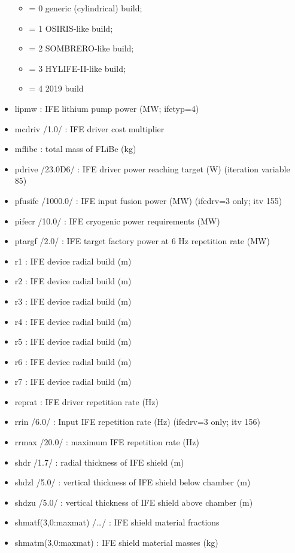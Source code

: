 \documentclass[]{article}
\providecommand{\tightlist}{%
  \setlength{\itemsep}{0pt}\setlength{\parskip}{0pt}}
\begin{document}
\begin{itemize}
  \begin{itemize}
  \tightlist
  \item
    = 0 generic (cylindrical) build;
  \item
    = 1 OSIRIS-like build;
  \item
    = 2 SOMBRERO-like build;
  \item
    = 3 HYLIFE-II-like build;
  \item
    = 4 2019 build
  \end{itemize}
\item
  lipmw : IFE lithium pump power (MW; ifetyp=4)
\item
  mcdriv /1.0/ : IFE driver cost multiplier
\item
  mflibe : total mass of FLiBe (kg)
\item
  pdrive /23.0D6/ : IFE driver power reaching target (W) (iteration
  variable 85)
\item
  pfusife /1000.0/ : IFE input fusion power (MW) (ifedrv=3 only; itv
  155)
\item
  pifecr /10.0/ : IFE cryogenic power requirements (MW)
\item
  ptargf /2.0/ : IFE target factory power at 6 Hz repetition rate (MW)
\item
  r1 : IFE device radial build (m)
\item
  r2 : IFE device radial build (m)
\item
  r3 : IFE device radial build (m)
\item
  r4 : IFE device radial build (m)
\item
  r5 : IFE device radial build (m)
\item
  r6 : IFE device radial build (m)
\item
  r7 : IFE device radial build (m)
\item
  reprat : IFE driver repetition rate (Hz)
\item
  rrin /6.0/ : Input IFE repetition rate (Hz) (ifedrv=3 only; itv 156)
\item
  rrmax /20.0/ : maximum IFE repetition rate (Hz)
\item
  shdr /1.7/ : radial thickness of IFE shield (m)
\item
  shdzl /5.0/ : vertical thickness of IFE shield below chamber (m)
\item
  shdzu /5.0/ : vertical thickness of IFE shield above chamber (m)
\item
  shmatf(3,0:maxmat) /\ldots{}/ : IFE shield material fractions
\item
  shmatm(3,0:maxmat) : IFE shield material masses (kg)

\end{itemize}
\end{document}
